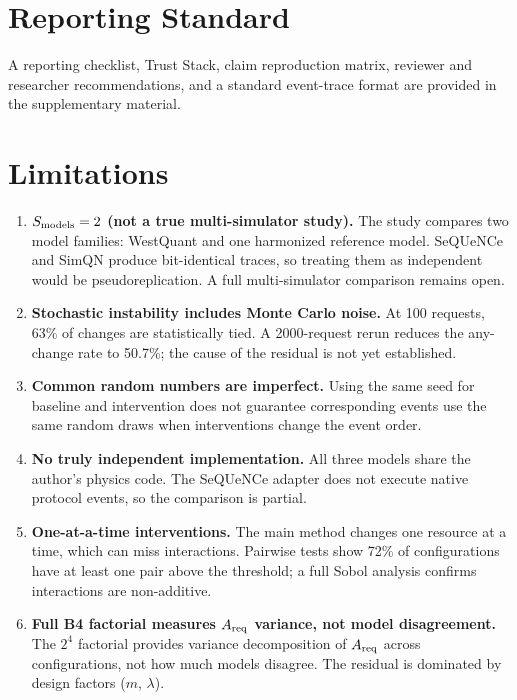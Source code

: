 \documentclass{ams-journal}
\begin{document}
\section{Reporting Standard}
\label{sec:standard}

A reporting checklist, Trust Stack, claim reproduction matrix, reviewer and researcher recommendations, and a standard event-trace format are provided in the supplementary material.

\section{Limitations}
\label{sec:limitations}

\begin{enumerate}[leftmargin=2em]
\item \textbf{$S_{\rm models} = 2$ (not a true multi-simulator study).} The study compares two model families: WestQuant and one harmonized reference model. SeQUeNCe and SimQN produce bit-identical traces, so treating them as independent would be pseudoreplication. A full multi-simulator comparison remains open.

\item \textbf{Stochastic instability includes Monte Carlo noise.} At 100 requests, 63\% of changes are statistically tied. A 2000-request rerun reduces the any-change rate to 50.7\%; the cause of the residual is not yet established.

\item \textbf{Common random numbers are imperfect.} Using the same seed for baseline and intervention does not guarantee corresponding events use the same random draws when interventions change the event order.

\item \textbf{No truly independent implementation.} All three models share the author's physics code. The SeQUeNCe adapter does not execute native protocol events, so the comparison is partial.

\item \textbf{One-at-a-time interventions.} The main method changes one resource at a time, which can miss interactions. Pairwise tests show 72\% of configurations have at least one pair above the threshold; a full Sobol analysis confirms interactions are non-additive.

\item \textbf{Full B4 factorial measures $A_{\rm req}$ variance, not model disagreement.} The $2^4$ factorial provides variance decomposition of $A_{\rm req}$ across configurations, not how much models disagree. The residual is dominated by design factors ($m$, $\lambda$).


\end{enumerate}
\end{document}
